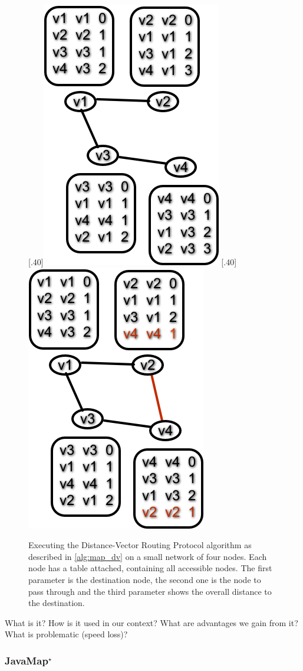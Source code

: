 \begin{figure}
   [.40\linewidth]{\includegraphics[width=.40\linewidth]{images/dv4.png}}
   [.40\linewidth]{\includegraphics[width=.40\linewidth]{images/dv5.png}}
                 
  \caption{Executing the Distance-Vector Routing Protocol algorithm as described in \autoref{alg:map_dv} on a small network of four nodes. Each node has a table attached, containing all accessible nodes. The first parameter is the destination node, the second one is the node to pass through and the third parameter shows the overall distance to the destination.}
  \label{fig:dv}
\end{figure}

What is it? How is it used in our context? What are advantages we gain from it? What is problematic (speed loss)?

\subsubsection[JavaMap]{JavaMap$^\star$}\label{alg:map_javamap}